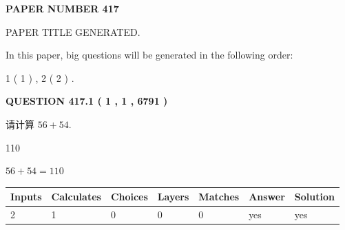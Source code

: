 \documentclass{ctexart}
\begin{document}
   
 {\textbf{ \Large{ PAPER NUMBER  417  }}}
   
   
\vspace{0.2in}
   
   
   
   
   
   
   
   
 \vspace{0.2in}
 
 
 
 
   
   
 PAPER TITLE GENERATED.
   
   
   
\vspace{0.2in}
   
In this paper, big questions will be generated in the following order: 
   
   
   1 ( 1 )
 ,
   2 ( 2 )
 .
  
\vspace{0.2in}
  
{\textbf{\Large{QUESTION
417.1 
 ( 1 , 1 , 6791 )
}}}
  
  
 
请计算 $ %
56 +  %
54 $.
 
 
 
\noindent{}
 
 

110
 
 
\noindent{}
 
 

 
 
 
\noindent{}
 
 

$ %
56 +  %
54=   %
110$
 
 
\noindent{}
 
 

 
   
   
   
   
\noindent\begin{tabular}{|l|l|l|l|l|l|l|}
 \hline
Inputs & Calculates & Choices & Layers & Matches & Answer & Solution \\ \hline
 2  & 
 1  & 
 0
  & 
 0  & 
 0  & 
  yes & 
  yes 
  \\ \hline
 \end{tabular}
   
\end{document}
